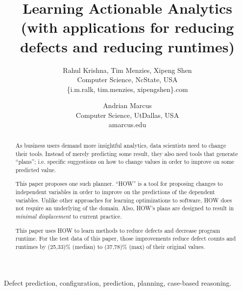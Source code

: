 \documentclass[conference]{IEEEtran}
\title{Learning Actionable Analytics 
 (with applications for reducing defects and reducing runtimes)}
\author{
%
%
Rahul Krishna, Tim Menzies, Xipeng Shen\\
        Computer Science, NcState, USA\\
       \{i.m.ralk, tim.menzies, xipengshen\}\@gmail.com
\and
 Andrian Marcus\\
       Computer Science, UtDallas, USA \\
       amarcus\@utdallas.edu }
\begin{document}
  \maketitle
  
  
   
  \begin{abstract}
 As business users demand more insightful
 analytics, data scientists need to change
 their tools. Instead of merely predicting 
 some result, they also need tools that generate ``plans'';
 i.e. specific suggestions on  how to change values in order to
 improve on some predicted value.
 
 This paper proposes one such planner. ``HOW'' is a 
 tool for proposing changes to independent
 variables in order to improve on 
 the predictions of the dependent variables. Unlike other approaches
 for learning optimizations to software, HOW does not require
 an underlying of the domain. Also, HOW's plans
 are designed to result in {\em minimal displacement}
 to current practice.
 
 This paper uses  HOW to learn methods
 to reduce defects and decrease program runtime.
 For the test data of this paper, those improvements   reduce
 defect counts and  runtimes by   
 (25,33)\% (median)   to (37,78)\% (max) of
 their original values.
  \end{abstract}
  \begin{IEEEkeywords}
Defect prediction, configuration, prediction, planning, case-based reasoning.
  \end{IEEEkeywords}
  
\end{document}
